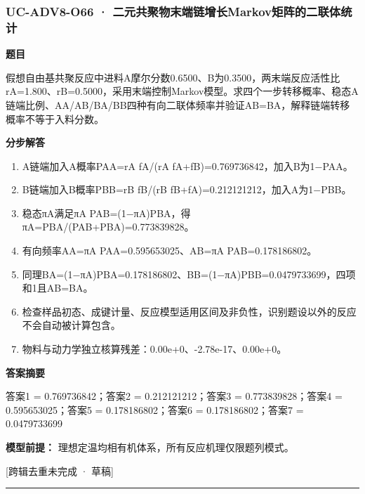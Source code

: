 \documentclass[UTF8,11pt,a4paper]{ctexart}
\begin{document}
\subsubsection*{UC-ADV8-O66 · 二元共聚物末端链增长Markov矩阵的二联体统计}
\noindent\textbf{题目}\par
假想自由基共聚反应中进料A摩尔分数0.6500、B为0.3500，两末端反应活性比rA=1.800、rB=0.5000，采用末端控制Markov模型。求四个一步转移概率、稳态A链端比例、AA/AB/BA/BB四种有向二联体频率并验证AB=BA，解释链端转移概率不等于入料分数。\par
\medskip\noindent\textbf{分步解答}
\begin{enumerate}
\item A链端加入A概率PAA=rA fA/(rA fA+fB)=0.769736842，加入B为1−PAA。
\item B链端加入B概率PBB=rB fB/(rB fB+fA)=0.212121212，加入A为1−PBB。
\item 稳态πA满足πA PAB=(1−πA)PBA，得πA=PBA/(PAB+PBA)=0.773839828。
\item 有向频率AA=πA PAA=0.595653025、AB=πA PAB=0.178186802。
\item 同理BA=(1−πA)PBA=0.178186802、BB=(1−πA)PBB=0.0479733699，四项和1且AB=BA。
\item 检查样品初态、成键计量、反应模型适用区间及非负性，识别题设以外的反应不会自动被计算包含。
\item 物料与动力学独立核算残差：0.00e+0、-2.78e-17、0.00e+0。
\end{enumerate}
\noindent\textbf{答案摘要}\par
答案1 = 0.769736842；答案2 = 0.212121212；答案3 = 0.773839828；答案4 = 0.595653025；答案5 = 0.178186802；答案6 = 0.178186802；答案7 = 0.0479733699\par
\noindent\textbf{模型前提：}
理想定温均相有机体系，所有反应机理仅限题列模式。\par
\noindent\textcolor{red!65!black}{[跨辑去重未完成 · 草稿]} \par
\medskip\hrule\medskip
{}
\end{document}
